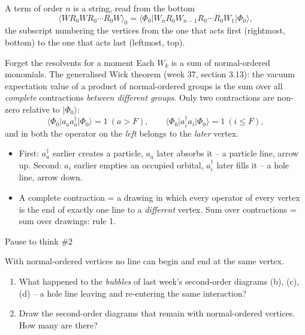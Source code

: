 \documentclass[aspectratio=169,10pt]{beamer}
\newcounter{thinkctr}
\newcommand{\thinkq}[2]{%
  \stepcounter{thinkctr}%
  \vfill
  \begin{tcolorbox}[enhanced,colback=palewarm,colframe=warm,boxrule=1.2pt,arc=4pt,
    grow to left by=6mm,grow to right by=6mm,
    left=16pt,right=16pt,top=16pt,bottom=18pt,
    fonttitle=\bfseries\Large,fontupper=\Large,
    title={Pause to think \#\thethinkctr\hfill\mdseries\normalsize(about #1 min -- discuss with your neighbour)}]
  #2
  \end{tcolorbox}
  \vfill}
\newcommand{\ket}[1]{\vert #1\rangle}
\newcommand{\mel}[3]{\langle #1\lvert #2\rvert #3\rangle}
\newcommand{\av}[1]{\langle #1\rangle_0}
\newcommand{\cre}[1]{a_{#1}^{\dagger}}
\newcommand{\ann}[1]{a_{#1}}
\newcommand{\ph}{\Phi_0}
\begin{document}
\begin{frame}[shrink=12]{A term of order \(n\) is a string, read from the bottom}
\[
\av{WR_0WR_0\cdots R_0W}=\mel{\ph}{W_nR_0W_{n-1}R_0\cdots R_0W_1}{\ph},
\]
the subscript numbering the vertices from the one that acts first (rightmost, bottom) to the one that acts last (leftmost, top).
\begin{block}{Forget the resolvents for a moment}
Each \(W_k\) is a sum of normal-ordered monomials. The generalised Wick theorem (week 37, section 3.13): the vacuum expectation value of a product of normal-ordered groups is the sum over all \emph{complete} contractions \emph{between different groups}. Only two contractions are non-zero relative to \(\ket{\ph}\):
\[
\boxed{\mel{\ph}{\ann{a}\cre{a}}{\ph}=1\ (a>F),\qquad \mel{\ph}{\cre{i}\ann{i}}{\ph}=1\ (i\le F),}
\]
and in both the operator on the \emph{left} belongs to the \emph{later} vertex.
\end{block}
\begin{itemize}
\item First: \(\cre{a}\) earlier creates a particle, \(\ann{a}\) later absorbs it -- a \alert{particle line}, arrow up. Second: \(\ann{i}\) earlier empties an occupied orbital, \(\cre{i}\) later fills it -- a \alert{hole line}, arrow down.
\item A complete contraction = a drawing in which every operator of every vertex is the end of exactly one line to a \emph{different} vertex. \alert{Sum over contractions = sum over drawings}: rule 1.
\end{itemize}
\end{frame}

\begin{frame}{Pause to think \#2}
\thinkq{3}{With normal-ordered vertices no line can begin and end at the same vertex.
\begin{enumerate}
\item What happened to the \emph{bubbles} of last week's second-order diagrams (b), (c), (d) -- a hole line leaving and re-entering the same interaction?
\item Draw the second-order diagrams that remain with normal-ordered vertices. How many are there?
\end{enumerate}}
\end{frame}
\end{document}

